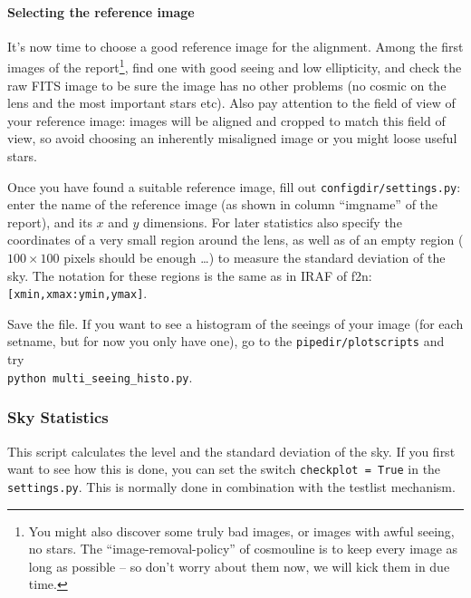 
\paragraph{Selecting the reference image}

It's now time to choose a good reference image for the alignment. Among the first images of the report\footnote{You might also discover some truly bad images, or images with awful seeing, no stars. The ``image-removal-policy'' of cosmouline is to keep every image as long as possible -- so don't worry about them now, we will kick them in due time.}, find one with good seeing and low ellipticity, and check the raw FITS image to be sure the image has no other problems (no cosmic on the lens and the most important stars etc). Also pay attention to the field of view of your reference image: images will be aligned and cropped to match this field of view, so avoid choosing an inherently misaligned image or you might loose useful stars.

Once you have found a suitable reference image, fill out \verb+configdir/settings.py+:
enter the name of the reference image (as shown in column ``imgname'' of the report), and its $x$ and $y$ dimensions. For later statistics also specify the coordinates of a very small region around the lens, as well as of an empty region ($100 \times 100$ pixels should be enough \ldots) to measure the standard deviation of the sky. The notation for these regions is the same as in IRAF of f2n:\verb+[xmin,xmax:ymin,ymax]+.

Save the file. If you want to see a histogram of the seeings of your image (for each setname, but for now you only have one), go to the \verb+pipedir/plotscripts+ and try \\
\verb+python multi_seeing_histo.py+.


\subsubsection{Sky Statistics}

This script calculates the level and the standard deviation of the sky. If you first want to see how this is done, you can set the switch \verb+checkplot = True+ in the \verb+settings.py+. This is normally done in combination with the testlist mechanism.

